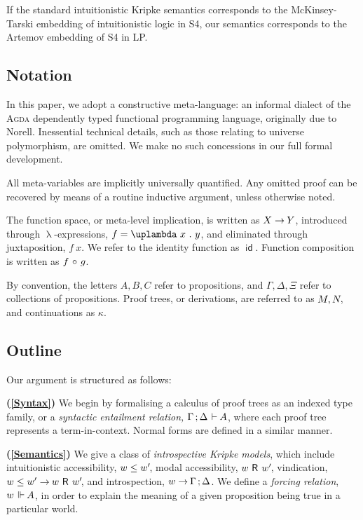\documentclass[submission,copyright,creativecommons,sharealike,backref=page]{eptcs}
\newcommand{\sA}{\mkern-2muA}
\newcommand{\R}{\mathrel{\rlap{$\mkern.75mu\textsf{R}$}\hphantom{\subseteq}}}
\renewcommand{\:}{\mathop{\mkern3mu:\mkern3mu}}
\renewcommand{\.}{\mathop{\mkern3mu.\mkern3mu}}
\renewcommand{\;}{\mathop{;}}
\renewcommand{\,}{\mathop{,}}
\renewcommand{\o}{\mathop{\mkern3mu\circ\mkern3mu}}
\newcommand{\id}{\operatorname{\textsf{id}}}
\newcommand{\e}{\mathrel{\mkern2mu\vdash\mkern1mu}}
\newcommand{\ee}{\mathrel{\mkern2mu\Vdash\mkern1mu}}
\renewcommand{\r}{\mathrel{\rightarrow\mkern-1mu}}
\theoremstyle{mystyle}
\begin{document}
If the standard intuitionistic Kripke semantics corresponds to the McKinsey-Tarski\cite{McKinseyT48} embedding of intuitionistic logic in S4, our semantics corresponds to the Artemov embedding of S4 in LP.


\subsection*{Notation}

In this paper, we adopt a constructive meta-language: an informal dialect of the \textsc{Agda} dependently typed functional programming language, originally due to Norell\cite{Norell07}.  Inessential technical details, such as those relating to universe polymorphism, are omitted.  We make no such concessions in our full formal development.

All meta-variables are implicitly universally quantified.  Any omitted proof can be recovered by means of a routine inductive argument, unless otherwise noted.  

The function space, or meta-level implication, is written as $X \r Y$, introduced through $\uplambda$-expressions, $f = \uplambda~x \. y$, and eliminated through juxtaposition, $f~x$.  We refer to the identity function as $\id$.  Function composition is written as $f \o g$.

By convention, the letters $A, B, C$ refer to propositions, and $\Gamma, \Delta, \Xi$ refer to collections of propositions.  Proof trees, or derivations, are referred to as $M, N\mkern-3mu$, and continuations as $\kappa$.


\subsection*{Outline}

Our argument is structured as follows:

\textbf{(\ref{Syntax})} We begin by formalising a calculus of proof trees as an indexed type family, or a \emph{syntactic entailment relation,} $\Gamma \; \Delta \e \sA$, where each proof tree represents a term-in-context.  Normal forms are defined in a similar manner.

\textbf{(\ref{Semantics})} We give a class of \emph{introspective Kripke models}, which include intuitionistic accessibility, $w \le w'\mkern-3mu$, modal accessibility, $w \R w'\mkern-3mu$, vindication, $w \le w' \r w \R w'\mkern-3mu$, and introspection, $w \r \Gamma \; \Delta$.  We define a \emph{forcing relation}, $w \ee \sA$, in order to explain the meaning of a given proposition being true in a particular world.
\end{document}
